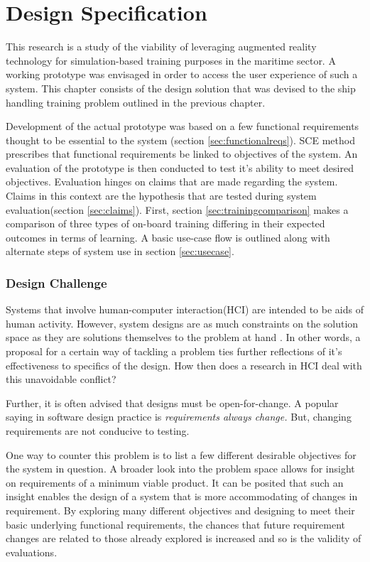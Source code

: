 \chapter{Design Specification}
This research is a study of the viability of leveraging augmented reality technology for simulation-based training purposes in the maritime sector. A working prototype was envisaged in order to access the user experience of such a system. This chapter consists of the design solution that was devised to the ship handling training problem outlined in the previous chapter. 

Development of the actual prototype was based on a few functional requirements thought to be essential to the system (section \ref{sec:functionalreqs}). SCE method prescribes that functional requirements be linked to objectives of the system. An evaluation of the prototype is then conducted to test it's ability to meet desired objectives. Evaluation hinges on claims that are made regarding the system. Claims in this context are the hypothesis that are tested during system evaluation(section \ref{sec:claims}). First, section \ref{sec:trainingcomparison} makes a comparison of three types of on-board training differing in their expected outcomes in terms of learning. A basic use-case flow is outlined along with alternate steps of system use in section \ref{sec:usecase}.


\subsection{Design Challenge}
\label{sec:designchallenge}
Systems that involve human-computer interaction(HCI) are intended to be aids of human activity. However, system designs are as much constraints on the solution space as they are solutions themselves to the problem at hand \parencite{carroll2000five}. In other words, a proposal for a certain way of tackling a problem ties further reflections of it's effectiveness to specifics of the design. How then does a research in HCI deal with this unavoidable conflict?

Further, it is often advised that designs must be open-for-change. A popular saying in software design practice is \textit{requirements always change.} But, changing requirements are not conducive to testing. 
 
One way to counter this problem is to list a few different desirable objectives for the system in question. A broader look into the problem space allows for insight on requirements of a minimum viable product. It can be posited that such an insight enables the design of a system that is more accommodating of changes in requirement. By exploring many different objectives and designing to meet their basic underlying functional requirements, the chances that future requirement changes are related to those already explored is increased and so is the validity of evaluations. 

